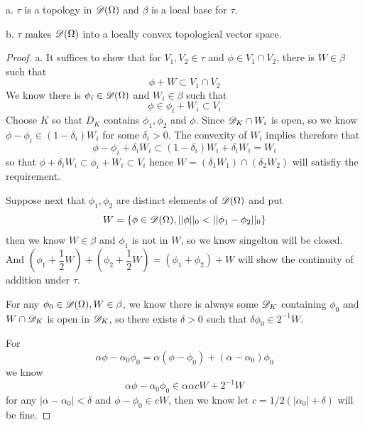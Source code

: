 \begin{theorem}
    a. $\tau$ is a topology in $\mathscr{D}(\Omega)$ and $\beta$ is a local base for $\tau$.\par
    b. $\tau$ makes $\mathscr{D}(\Omega)$ into a locally convex topological vector space.
\end{theorem}
\begin{proof}
    a. It suffices to show that for $V_1,V_2 \in \tau$ and $\phi \in V_1\cap V_2$, there is $W \in \beta$ such that
    \[\phi + W \subset V_1\cap V_2\]
    We know there is $\phi_i\in\mathscr{D}(\Omega)$ and $W_i\in\beta$ such that
    \[
    \phi \in \phi_i + W_i\subset V_i
    \]
    Choose $K$ so that $D_K$ contains $\phi_1,\phi_2$ and $\phi$. Since $\mathscr{D}_K\cap W_i$ is open, so we know $\phi-\phi_i \in (1-\delta_i)W_i$ for some $\delta_i > 0$. The convexity of $W_i$ implies therefore that
    \[\phi - \phi_i + \delta_iW_i\subset (1-\delta_i)W_i+\delta_iW_i = W_i\]
    so that $\phi+\delta_iW_i \subset \phi_i+W_i \subset V_i$ hence $W = (\delta_1W_1)\cap(\delta_2W_2)$ will satisfiy the requirement.\par
    Suppose next that $\phi_1,\phi_2$ are distinct elements of $\mathscr{D}(\Omega)$ and put
    \[W = \{\phi \in \mathscr{D}(\Omega), ||\phi||_0 < ||\phi_1-\phi_2||_0\}\]
    then we know $W\in\beta$ and $\phi_1$ is not in $W$, so we know singelton will be closed. And $(\phi_1 + \dfrac{1}{2}W)+(\phi_2 + \dfrac{1}{2}W) = (\phi_1+\phi_2)+W$ will show the continuity of addition under $\tau$.\par
    For any $\phi_0 \in \mathscr{D}(\Omega), W\in\beta$, we know there is always some $\mathscr{D}_K$ containing $\phi_0$ and $W\cap \mathscr{D}_K$ is open in $\mathscr{D}_K$, so there exists $\delta > 0$ such that $\delta \phi_0 \in 2^{-1}W$.\par
    For
    \[\alpha \phi - \alpha_0\phi_0 = \alpha(\phi-\phi_0)+(\alpha-\alpha_0)\phi_0\]
    we know
    \[
    \alpha\phi - \alpha_0\phi_0 \in \alpha \alpha cW + 2^{-1}W
    \]
    for any $|\alpha - \alpha_0| < \delta$ and $\phi-\phi_0 \in cW$, then we know let $c = 1/2(|\alpha_0|+\delta)$ will be fine.
\end{proof}

